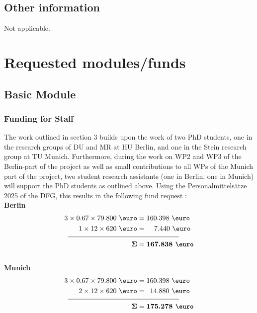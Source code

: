 \documentclass[a4paper,11pt,headings=normal]{scrartcl}
\newcommand{\ehl}{\color{black}}
\begin{document}
\subsection{Other information}
Not applicable. 

\section{Requested modules/funds}
\subsection{Basic Module}
\subsubsection{Funding for Staff}
The work outlined in section 3 builds upon the work of two PhD students, one in 
the research groups of DU and MR at HU Berlin, and one in the Stein research 
group at TU Munich. Furthermore, during the work on WP2 and WP3 of the 
Berlin-part of the project as well as small contributions to all WPs of the Munich part of the project, 
two student research assistants (one in Berlin, one in Munich) will support the 
PhD students as outlined above. Using the Personalmittelsätze 2025 of the DFG, 
this results in the following fund request :\\
\textbf{Berlin}
\begin{align*}
	\text{3} \times 0.67 \times \text{79.800  \euro} &=  \text{160.398 \euro}\\
	\text{1} \times \text{12} \times \text{620 \euro} &=  \hspace{1.1em}\text{7.440 
	\euro} 
	\\[-0.75em]
\underline{\hspace{3.5cm}}&\underline{\qquad \qquad \qquad}\\
	\mathbf{\Sigma} &= \textbf{167.838 \euro} 
\end{align*}
\ \\
\noindent
\textbf{Munich}
\begin{align*}
	\text{3} \times 0.67 \times \text{79.800 \euro} &=  \text{160.398	\euro}\\
  \text{2} \times \text{12} \times \text{620 \euro} &= \hspace{0.5em}
  \text{14.880	\euro}\\[-0.75em]\ehl
\underline{\hspace{3.5cm}}&\underline{\qquad \qquad \qquad}\\
\mathbf{\Sigma} &= \textbf{175.278 \euro}
\end{align*}
\end{document}
